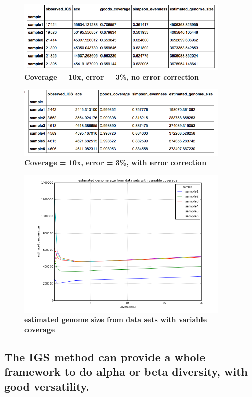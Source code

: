 \begin{figure}[!ht]
 \centerline{\includegraphics[width=4in]{./figures/IGS_table_alpha1_10x_3_ne.png}}
\caption{\bf Coverage = 10x, error = 3\%, no error correction}
\label{fig:IGS_table_alpha1_10x_3_ne}
\end{figure}



\begin{figure}[!ht]
 \centerline{\includegraphics[width=4in]{./figures/IGS_table_alpha1_10x_3_e.png}}
\caption{\bf Coverage = 10x, error = 3\%, with error correction}
\label{fig:IGS_table_alpha1_10x_3_e}
\end{figure}

\begin{figure}[!ht]
 \centerline{\includegraphics[width=4in]{./figures/IGS_figure_test_alpha.png}}
\caption{\bf estimated genome size from data sets with variable coverage}
\label{fig:IGS_figure_test_alpha}
\end{figure}


\subsection{The IGS method can provide a whole framework to do alpha or beta diversity, with good versatility.}

